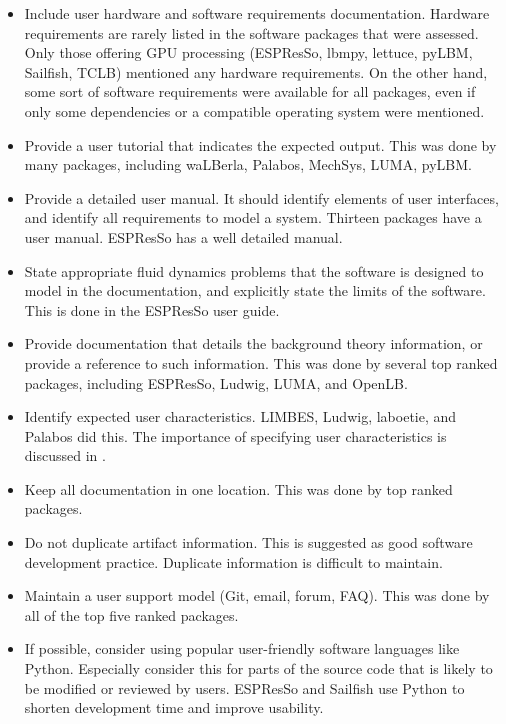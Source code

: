\documentclass[final, 3p, times, authoryear]{elsarticle}
\begin{document}
\begin{itemize}
	\item Include user hardware and software requirements documentation.
	Hardware requirements are rarely listed in the software packages that were
	assessed. Only those offering GPU processing (ESPResSo, lbmpy, lettuce,
	pyLBM, Sailfish, TCLB) mentioned any hardware requirements. On the other
	hand, some sort of software requirements were available for all packages,
	even if only some dependencies or a compatible operating system were
	mentioned.
	\item Provide a user tutorial that indicates the expected output. This was
	done by many packages, including waLBerla, Palabos, MechSys, LUMA, pyLBM.
	\item Provide a detailed user manual. It should identify elements of user
	interfaces, and identify all requirements to model a system. Thirteen
	packages have a user manual. ESPResSo has a well detailed manual.
	\item State appropriate fluid dynamics problems that the software is
	designed to model in the documentation, and explicitly state the limits of
	the software. This is done in the ESPResSo user guide.
	\item Provide documentation that details the background theory information,
	or provide a reference to such information. This was done by several top
	ranked packages, including ESPResSo, Ludwig, LUMA, and OpenLB.
	\item Identify expected user characteristics. LIMBES, Ludwig, laboetie, and
	Palabos did this. The importance of specifying user characteristics is
	discussed in \citep{smith2007requirements}.
	\item Keep all documentation in one location. This was done by top ranked
	packages.
	\item Do not duplicate artifact information. This is suggested as good
	software development practice. Duplicate information is difficult to
	maintain. 
	\item Maintain a user support model (Git, email, forum, FAQ). This was done
	by all of the top five ranked packages.
	\item If possible, consider using popular user-friendly software languages
	like Python. Especially consider this for parts of the source code that is
	likely to be modified or reviewed by users. ESPResSo and Sailfish use Python
	to shorten development time and improve usability.
\end{itemize}
\end{document}
